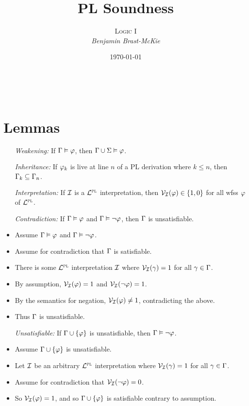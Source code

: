 \documentclass[a4paper, 11pt]{article} %
\title{\textbf{PL Soundness}} %
\author{\textsc{Logic I}\\ \em Benjamin Brast-McKie} %
\date{\today} %
\makeatletter
\renewcommand{\maketitle}{
\begin{flushright}
{\LARGE\@title}

\vspace{10pt}

{\@author}
\\ \@date
\end{flushright}

\vspace{-20pt}

}
\makeatother
\begin{document}
\maketitle %

\thispagestyle{empty}


\section*{Lemmas}

\begin{itemize}
  \item[\it Weakening:] If $\Gamma \vDash \varphi$, then $\Gamma \cup \Sigma \vDash \varphi$.
  \item[\it Inheritance:] If $\varphi_k$ is live at line $n$ of a PL derivation where $k\leq n$, then $\Gamma_k\subseteq \Gamma_n$.
  \item[\it Interpretation:] If $\mathcal{I}$ is a $\mathcal{L}^{\textsc{pl}}$ interpretation, then $\mathcal{V}_{\mathcal{I}}(\varphi) \in \lbrace1,0\rbrace$ for all wfss $\varphi$ of $\mathcal{L}^{\textsc{pl}}$. 
  \item[\it Contradiction:] If $\Gamma \vDash \varphi$ and $\Gamma \vDash \neg\varphi$, then $\Gamma$ is unsatisfiable.
    \item Assume $\Gamma \vDash \varphi$ and $\Gamma \vDash \neg\varphi$.
    \item Assume for contradiction that $\Gamma$ is satisfiable. 
    \item There is some $\mathcal{L}^{\textsc{pl}}$ interpretation $\mathcal{I}$ where $\mathcal{V}_{\mathcal{I}}(\gamma) = 1$ for all $\gamma \in \Gamma$.
    \item By assumption, $\mathcal{V}_{\mathcal{I}}(\varphi) = 1$ and $\mathcal{V}_{\mathcal{I}}(\neg \varphi) = 1$.
    \item By the semantics for negation, $\mathcal{V}_{\mathcal{I}}(\varphi) \neq 1$, contradicting the above.
    \item Thus $\Gamma$ is unsatisfiable. 
  \item[\it Unsatisfiable:] If $\Gamma \cup \lbrace\varphi\rbrace$ is unsatisfiable, then $\Gamma \vDash \neg\varphi$.
    \item Assume $\Gamma \cup \lbrace\varphi\rbrace$ is unsatisfiable.
    \item Let $\mathcal{I}$ be an arbitrary $\mathcal{L}^{\textsc{pl}}$ interpretation where $\mathcal{V}_{\mathcal{I}}(\gamma) = 1$ for all $\gamma \in \Gamma$. 
    \item Assume for contradiction that $\mathcal{V}_{\mathcal{I}}(\neg \varphi) = 0$.
    \item So $\mathcal{V}_{\mathcal{I}}(\varphi) = 1$, and so $\Gamma \cup \lbrace\varphi\rbrace$ is satisfiable contrary to assumption.

\end{itemize}
\end{document}
